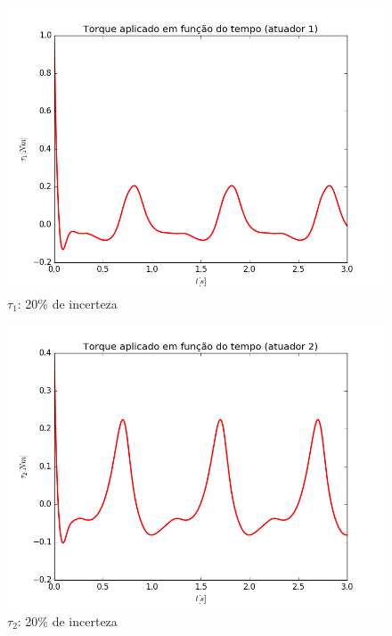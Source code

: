 \documentclass[]{politex}
\begin{document}
\begin{multicols}{2}
\begin{figure}[H]
	\centering
	\includegraphics[scale=0.40]{imagens/tau1_20.png}  
	\caption{$\tau_1$: 20\% de incerteza}
	\label{fig:Torque1_20}
\end{figure}
\begin{figure}[H]
	\centering
	\includegraphics[scale=0.40]{imagens/tau2_20.png}  
	\caption{$\tau_2$: 20\% de incerteza}
	\label{fig:Torque2_20}
\end{figure}
\end{multicols}
\end{document}
